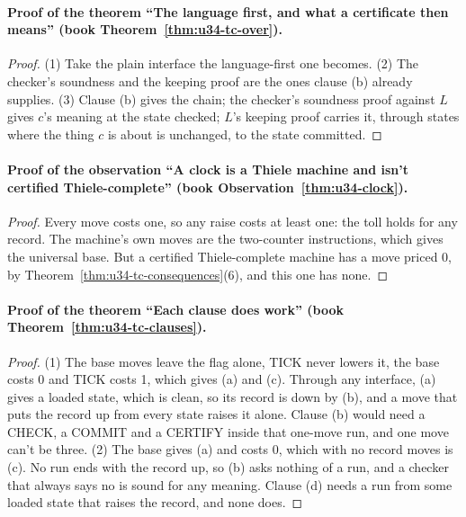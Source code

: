 \documentclass[11pt,twoside]{article}
\theoremstyle{thielethm}
\theoremstyle{thieledef}
\theoremstyle{thieledef}
\theoremstyle{thieledef}
\theoremstyle{thielethm}
\theoremstyle{thieleobs}
\theoremstyle{thielethm}
\begin{document}
\paragraph{Proof of the theorem ``The language first, and what a certificate then means'' (book Theorem~\ref{thm:u34-tc-over}).}
\begin{proof}
(1) Take the plain interface the language-first one becomes. (2) The checker's soundness and the
keeping proof are the ones clause (b) already supplies. (3) Clause (b) gives the chain; the
checker's soundness proof against $L$ gives $c$'s meaning at the state checked; $L$'s keeping
proof carries it, through states where the thing $c$ is about is unchanged, to the state
committed.
\end{proof}

\paragraph{Proof of the observation ``A clock is a Thiele machine and isn't certified Thiele-complete'' (book Observation~\ref{thm:u34-clock}).}
\begin{proof}
Every move costs one, so any raise costs at least one: the toll holds for any record. The
machine's own moves are the two-counter instructions, which gives the universal base. But a
certified Thiele-complete machine has a move priced 0, by Theorem~\ref{thm:u34-tc-consequences}(6), and this
one has none.
\end{proof}

\paragraph{Proof of the theorem ``Each clause does work'' (book Theorem~\ref{thm:u34-tc-clauses}).}
\begin{proof}
(1) The base moves leave the flag alone, TICK never lowers it, the base costs 0 and TICK costs 1,
which gives (a) and (c). Through any interface, (a) gives a loaded state, which is clean, so its
record is down by (b), and a move that puts the record up from every state raises it alone.
Clause (b) would need a CHECK, a COMMIT and a CERTIFY inside that one-move run, and one move
can't be three. (2) The base gives (a) and costs 0, which with no record moves is (c). No run
ends with the record up, so (b) asks nothing of a run, and a checker that always says no is
sound for any meaning. Clause (d) needs a run from some loaded state that raises the record,
and none does.
\end{proof}
\end{document}
